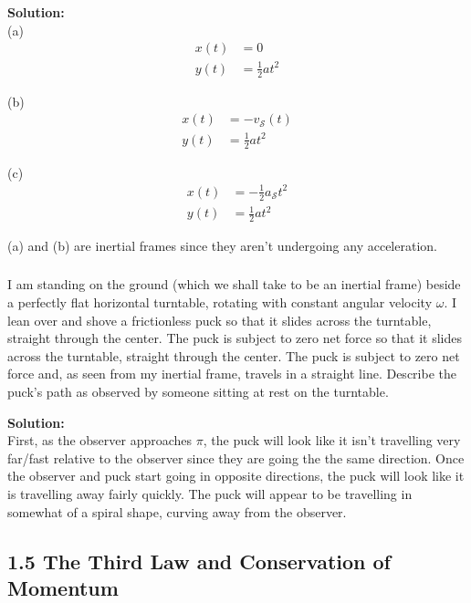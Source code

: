 \documentclass{article}
\newcommand\Problem{%
    \subsubsection{}%
}
\newcommand\TheSolution{%
  \textbf{Solution:}\\%
}
\begin{document}
\TheSolution
(a)
\begin{equation}
    \begin{aligned}
        x(t) & = 0                 \\
        y(t) & = \frac{1}{2} a t^2
    \end{aligned}
\end{equation}

(b)
\begin{equation}
    \begin{aligned}
        x(t) & = -v_{\mathcal{S}}(t) \\
        y(t) & = \frac{1}{2} a t^2
    \end{aligned}
\end{equation}

(c)
\begin{equation}
    \begin{aligned}
        x(t) & = -\frac{1}{2}a_{\mathcal{S}}t^2 \\
        y(t) & = \frac{1}{2} a t^2
    \end{aligned}
\end{equation}

(a) and (b) are inertial frames since they aren't undergoing any acceleration.

\Problem I am standing on the ground (which we shall take to be an inertial frame) beside a perfectly flat horizontal turntable, rotating with constant angular velocity $\omega$. I lean over and shove a frictionless puck so that it slides across the turntable, straight through the center. The puck is subject to zero net force so that it slides across the turntable, straight through the center. The puck is subject to zero net force and, as seen from my inertial frame, travels in a straight line. Describe the puck's path as observed by someone sitting at rest on the turntable.

\TheSolution
First, as the observer approaches $\pi$, the puck will look like it isn't travelling very far/fast relative to the observer since they are going the the same direction. Once the observer and puck start going in opposite directions, the puck will look like it is travelling away fairly quickly. The puck will appear to be travelling in somewhat of a spiral shape, curving away from the observer.

\subsection{1.5 The Third Law and Conservation of Momentum}
\end{document}
